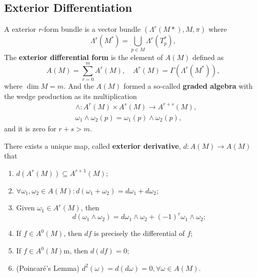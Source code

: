 \subsection{Exterior Differentiation}
\begin{definition}
A exterior $r$-form bundle is a vector bundle $(\Lambda^r(M*), M,\pi)$ where 
\begin{equation}
\Lambda^r(M^*) = \bigcup_{p\in M}\Lambda^r(T^*_p),
\end{equation}
The \textbf{exterior differential form} is the element of $A(M)$ defined as 
\begin{equation}
A(M)=\sum_{r=0}^mA^r(M),\quad A^r(M)=\Gamma(\Lambda^r(M^*)),
\end{equation}
where $\dim M=m$. And the $A(M)$ formed a so-called \textbf{graded algebra} with the wedge production as its multiplication
\begin{equation}
\begin{aligned}
&\wedge:A^r(M)\times A^s(M)\to A^{r+s}(M),\\
&\omega_1\wedge\omega_2(p)=\omega_1(p)\wedge\omega_2(p),
\end{aligned}
\end{equation}
and it is zero for $r+s>m$.
\end{definition}

\begin{theorem}
There exists a unique map, called \textbf{exterior derivative}, $d:A(M)\to A(M)$ that
\begin{enumerate}
\item $d(A^r(M))\subseteq A^{r+1}(M)$;
\item $\forall\omega_1,\omega_2\in A(M):d(\omega_1+\omega_2)=d\omega_1+d\omega_2$;
\item Given $\omega_1\in A^r(M)$, then
\begin{equation}
d(\omega_1\wedge\omega_2)=d\omega_1\wedge\omega_2+(-1)^r\omega_1\wedge\omega_2;
\end{equation}
\item If $f\in A^0(M)$, then $df$ is precisely the differential of $f$;
\item If $f\in A^0(M)$m, then $d(df)=0$;
\item (Poincar\'e's Lemma) $d^2(\omega)=d(d\omega)=0,\forall \omega\in A(M)$.
\end{enumerate}
\end{theorem}

